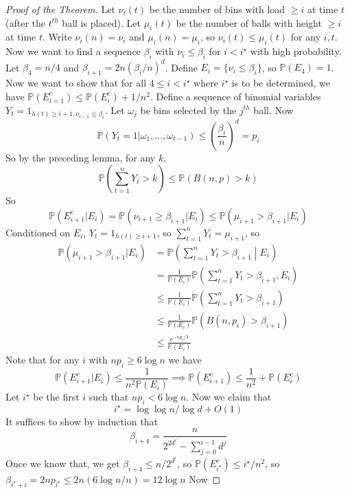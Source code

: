 \begin{proof}[Proof of the Theorem]
    Let $\nu_i(t)$ be the number of bins with load $\ge i$ at time $t$ (after the $t^{th}$ ball is placed).
    Let $\mu_i(t)$ be the number of balls with height $\ge i$ at time $t$.
    Write $\nu_i(n)=\nu_i$ and $\mu_i(n)=\mu_i$, so $\nu_i(t)\le\mu_i(t)$ for any $i,t$.
    Now we want to find a sequence $\beta_i$ with $\nu_i\le\beta_i$ for $i< i^\star$ with high probability.
    Let $\beta_4=n/4$ and $\beta_{i+1}=2n(\beta_i/n)^d$.
    Define $E_i=\{\nu_i\le\beta_i\}$, so $\mathbb P(E_4)=1$.
    Now we want to show that for all $4\le i<i^\star$ where $i^\star$ is to be determined, we have $\mathbb P(E_{i=1}^c)\le\mathbb P(E_i^c)+1/n^2$.
    Define a sequence of binomial variables $Y_t=1_{h(t)\ge i+1,\nu_{i-1}\le\beta_i}$.
    Let $\omega_j$ be bins selected by the $j^{th}$ ball.
    Now
    $$\mathbb P(Y_t=1|\omega_1,\ldots,\omega_{t-1})\le\left( \frac{\beta_i}{n} \right)^d=p_i$$
    So by the preceding lemma, for any $k$,
    $$\mathbb P\left( \sum_{t=1}^nY_t>k \right)\le\mathbb P(B(n,p)>k)$$
    So
    $$\mathbb P(E_{i+1}^c|E_i)=\mathbb P(\nu_{i+1}\ge\beta_{i+1}|E_i)\le\mathbb P(\mu_{i+1}>\beta_{i+1}|E_i)$$
    Conditioned on $E_i$, $Y_t=1_{h(t)\ge i+1}$, so $\sum_{t=1}^nY_t=\mu_{i+1}$, so
    \begin{align*}
        \mathbb P(\mu_{i+1}>\beta_{i+1}|E_i)&=\mathbb P\left( \sum_{t=1}^nY_t>\beta_{i+1}\middle|E_i \right)\\
        &=\frac{1}{\mathbb P(E_i)}\mathbb P\left( \sum_{t=1}^nY_t>\beta_{i+1},E_i \right)\\
        &\le\frac{1}{\mathbb P(E_i)}\mathbb P\left( \sum_{t=1}^nY_t>\beta_{i+1}\right)\\
        &\le\frac{1}{\mathbb P(E_i)}\mathbb P(B(n,p_i)>\beta_{i+1})\\
        &\le\frac{e^{-np_i/3}}{\mathbb P(E_i)}
    \end{align*}
    Note that for any $i$ with $np_i\ge 6\log n$ we have
    $$\mathbb P(E_{i+1}^c|E_i)\le\frac{1}{n^2\mathbb P(E_i)}\implies\mathbb P(E_{i+1}^c)\le\frac{1}{n^2}+\mathbb P(E_i^c)$$
    Let $i^\star$ be the first $i$ such that $np_i<6\log n$.
    Now we claim that
    $$i^\star=\log\log n/\log d+O(1)$$
    It suffices to show by induction that
    $$\beta_{i+4}=\frac{n}{2^{2d^i}-\sum_{j=0}^{i-1}d^j}$$
    Once we know that, we get $\beta_{i+4}\le n/2^{d^i}$, so $\mathbb P(E_{i^\star}^c)\le i^\star/n^2$, so $\beta_{i^\star+i}=2np_{i^\star}\le 2n(6\log n/n)=12\log n$
    Now
    

\end{proof}
